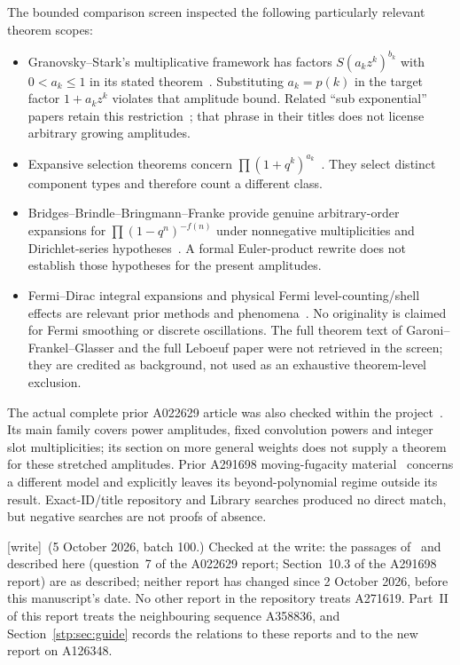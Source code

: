 \documentclass[11pt]{article}
\theoremstyle{remark}\newtheorem{remark}[theorem]{Remark}
\newcommand{\wtag}{\textup{[write]}}
\begin{document}
The bounded comparison screen inspected the following particularly relevant theorem scopes:
\begin{itemize}
\item Granovsky--Stark's multiplicative framework has factors $S(a_kz^k)^{b_k}$ with $0<a_k\le1$ in its stated theorem~\cite{GS}. Substituting $a_k=p(k)$ in the target factor $1+a_kz^k$ violates that amplitude bound. Related ``sub exponential'' papers retain this restriction~\cite{G16,G17}; that phrase in their titles does not license arbitrary growing amplitudes.
\item Expansive selection theorems concern $\prod(1+q^k)^{a_k}$~\cite{GSexp}. They select distinct component types and therefore count a different class.
\item Bridges--Brindle--Bringmann--Franke provide genuine arbitrary-order expansions for $\prod(1-q^n)^{-f(n)}$ under nonnegative multiplicities and Dirichlet-series hypotheses~\cite{BBBF}. A formal Euler-product rewrite does not establish those hypotheses for the present amplitudes.
\item Fermi--Dirac integral expansions and physical Fermi level-counting/shell effects are relevant prior methods and phenomena~\cite{GFG,GST,RL,Leboeuf}. No originality is claimed for Fermi smoothing or discrete oscillations. The full theorem text of Garoni--Frankel--Glasser and the full Leboeuf paper were not retrieved in the screen; they are credited as background, not used as an exhaustive theorem-level exclusion.
\end{itemize}
The actual complete prior A022629 article was also checked within the project~\cite{Prior22629}. Its main family covers power amplitudes, fixed convolution powers and integer slot multiplicities; its section on more general weights does not supply a theorem for these stretched amplitudes. Prior A291698 moving-fugacity material~\cite{Prior291698} concerns a different model and explicitly leaves its beyond-polynomial regime outside its result. Exact-ID/title repository and Library searches produced no direct match, but negative searches are not proofs of absence.

\wtag\ (5 October 2026, batch 100.) Checked at the write: the passages
of~\cite{Prior22629} and~\cite{Prior291698} described here (question~7 of
the A022629 report; Section~10.3 of the A291698 report) are as described;
neither report has changed since 2 October 2026, before this manuscript's
date. No other report in the repository treats A271619. Part~II of this report
treats the neighbouring sequence A358836, and Section~\ref{stp:sec:guide}
records the relations to these reports and to the new report on A126348.
\end{document}

